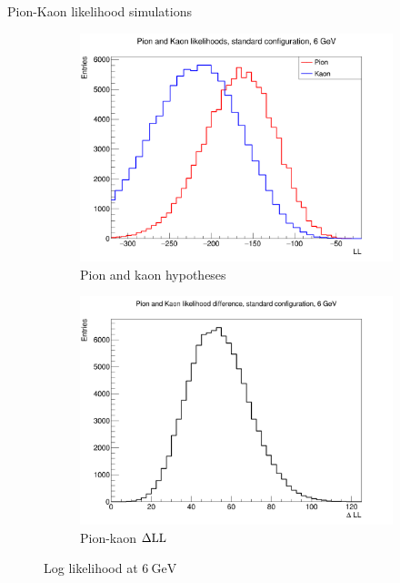 \documentclass{beamer}
\begin{document}
\begin{frame}{Pion-Kaon likelihood simulations}
  \begin{figure}
    \centering
    \vspace{-0.2cm}
    \begin{subfigure}{0.5\textwidth}
      \includegraphics[width = 1.0\textwidth]{Plots/PionKaonLL6GeVStandard.png}
      \caption{Pion and kaon hypotheses}
    \end{subfigure}%
    \begin{subfigure}{0.5\textwidth}
      \includegraphics[width = 1.0\textwidth]{Plots/PionKaonDLL6GeVStandard.png}
      \caption{Pion-kaon $\Delta{\rm LL}$}
    \end{subfigure}
    \caption{Log likelihood at $\SI{6}{\giga\eV}$}
  \end{figure}
\end{frame}
\end{document}
